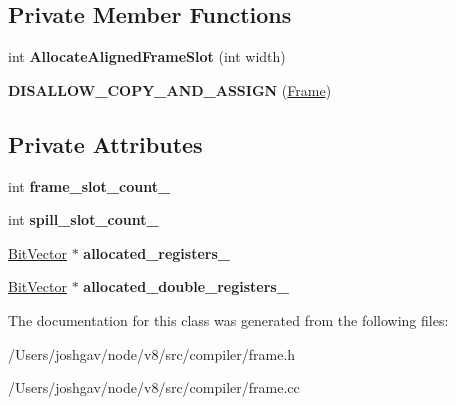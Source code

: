 \subsection*{Private Member Functions}
\begin{DoxyCompactItemize}
\item 
int {\bfseries Allocate\+Aligned\+Frame\+Slot} (int width)\hypertarget{classv8_1_1internal_1_1compiler_1_1_frame_a2f0da247fe85f82ee6358590e2ee01c4}{}\label{classv8_1_1internal_1_1compiler_1_1_frame_a2f0da247fe85f82ee6358590e2ee01c4}

\item 
{\bfseries D\+I\+S\+A\+L\+L\+O\+W\+\_\+\+C\+O\+P\+Y\+\_\+\+A\+N\+D\+\_\+\+A\+S\+S\+I\+GN} (\hyperlink{classv8_1_1internal_1_1compiler_1_1_frame}{Frame})\hypertarget{classv8_1_1internal_1_1compiler_1_1_frame_ab77ec3a32bb15c7ebda2e68de5788549}{}\label{classv8_1_1internal_1_1compiler_1_1_frame_ab77ec3a32bb15c7ebda2e68de5788549}

\end{DoxyCompactItemize}
\subsection*{Private Attributes}
\begin{DoxyCompactItemize}
\item 
int {\bfseries frame\+\_\+slot\+\_\+count\+\_\+}\hypertarget{classv8_1_1internal_1_1compiler_1_1_frame_add0ddcaf82428ced993c848992209cf4}{}\label{classv8_1_1internal_1_1compiler_1_1_frame_add0ddcaf82428ced993c848992209cf4}

\item 
int {\bfseries spill\+\_\+slot\+\_\+count\+\_\+}\hypertarget{classv8_1_1internal_1_1compiler_1_1_frame_a7b91da880f693ef388c921c32ae9c667}{}\label{classv8_1_1internal_1_1compiler_1_1_frame_a7b91da880f693ef388c921c32ae9c667}

\item 
\hyperlink{classv8_1_1internal_1_1_bit_vector}{Bit\+Vector} $\ast$ {\bfseries allocated\+\_\+registers\+\_\+}\hypertarget{classv8_1_1internal_1_1compiler_1_1_frame_a8061bc0f1543a114c391f2dca455c6f5}{}\label{classv8_1_1internal_1_1compiler_1_1_frame_a8061bc0f1543a114c391f2dca455c6f5}

\item 
\hyperlink{classv8_1_1internal_1_1_bit_vector}{Bit\+Vector} $\ast$ {\bfseries allocated\+\_\+double\+\_\+registers\+\_\+}\hypertarget{classv8_1_1internal_1_1compiler_1_1_frame_a8472651623acb3c413274af4b826544c}{}\label{classv8_1_1internal_1_1compiler_1_1_frame_a8472651623acb3c413274af4b826544c}

\end{DoxyCompactItemize}


The documentation for this class was generated from the following files\+:\begin{DoxyCompactItemize}
\item 
/\+Users/joshgav/node/v8/src/compiler/frame.\+h\item 
/\+Users/joshgav/node/v8/src/compiler/frame.\+cc\end{DoxyCompactItemize}
